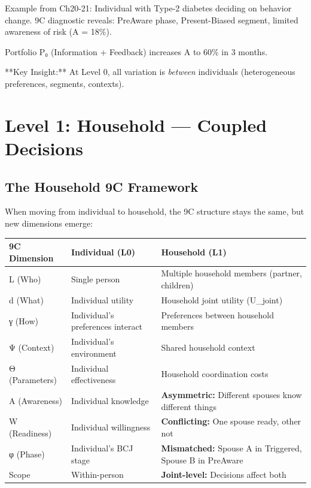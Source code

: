 Example from Ch20-21: Individual with Type-2 diabetes deciding on behavior change. 9C diagnostic reveals: PreAware phase, Present-Biased segment, limited awareness of risk (A = 18\%).

Portfolio P₀ (Information + Feedback) increases A to 60\% in 3 months.

**Key Insight:** At Level 0, all variation is \emph{between} individuals (heterogeneous preferences, segments, contexts).


\section{Level 1: Household --- Coupled Decisions}
\label{sec:level1-household}

\subsection{The Household 9C Framework}

When moving from individual to household, the 9C structure stays the same, but new dimensions emerge:

\begin{center}
\begin{tabular}{@{}lll@{}}
\toprule
\textbf{9C Dimension} & \textbf{Individual (L0)} & \textbf{Household (L1)} \\
\midrule
L (Who) & Single person & Multiple household members (partner, children) \\
d (What) & Individual utility & Household joint utility (U\_joint) \\
γ (How) & Individual's preferences interact & Preferences between household members \\
Ψ (Context) & Individual's environment & Shared household context \\
Θ (Parameters) & Individual effectiveness & Household coordination costs \\
A (Awareness) & Individual knowledge & \textbf{Asymmetric:} Different spouses know different things \\
W (Readiness) & Individual willingness & \textbf{Conflicting:} One spouse ready, other not \\
φ (Phase) & Individual's BCJ stage & \textbf{Mismatched:} Spouse A in Triggered, Spouse B in PreAware \\
Scope & Within-person & \textbf{Joint-level:} Decisions affect both \\
\midrule
\end{tabular}
\end{center}


